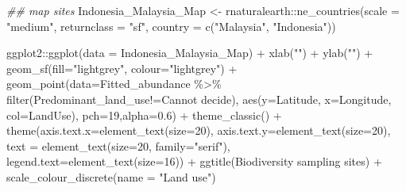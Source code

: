 \documentclass[
  letterpaper,
  DIV=11,
  numbers=noendperiod]{scrartcl}
\newenvironment{Shaded}{\begin{snugshade}}{\end{snugshade}}
\newcommand{\AttributeTok}[1]{\textcolor[rgb]{0.40,0.45,0.13}{#1}}
\newcommand{\DecValTok}[1]{\textcolor[rgb]{0.68,0.00,0.00}{#1}}
\newcommand{\DocumentationTok}[1]{\textcolor[rgb]{0.37,0.37,0.37}{\textit{#1}}}
\newcommand{\FloatTok}[1]{\textcolor[rgb]{0.68,0.00,0.00}{#1}}
\newcommand{\FunctionTok}[1]{\textcolor[rgb]{0.28,0.35,0.67}{#1}}
\newcommand{\NormalTok}[1]{\textcolor[rgb]{0.00,0.23,0.31}{#1}}
\newcommand{\OtherTok}[1]{\textcolor[rgb]{0.00,0.23,0.31}{#1}}
\newcommand{\SpecialCharTok}[1]{\textcolor[rgb]{0.37,0.37,0.37}{#1}}
\newcommand{\StringTok}[1]{\textcolor[rgb]{0.13,0.47,0.30}{#1}}
\begin{document}
\begin{Shaded}
\begin{Highlighting}[]
\DocumentationTok{\#\# map sites}
\NormalTok{Indonesia\_Malaysia\_Map }\OtherTok{\textless{}{-}}\NormalTok{ rnaturalearth}\SpecialCharTok{::}\FunctionTok{ne\_countries}\NormalTok{(}\AttributeTok{scale =} \StringTok{"medium"}\NormalTok{, }\AttributeTok{returnclass =} \StringTok{"sf"}\NormalTok{, }\AttributeTok{country =} \FunctionTok{c}\NormalTok{(}\StringTok{"Malaysia"}\NormalTok{, }\StringTok{"Indonesia"}\NormalTok{))}

\NormalTok{ggplot2}\SpecialCharTok{::}\FunctionTok{ggplot}\NormalTok{(}\AttributeTok{data =}\NormalTok{ Indonesia\_Malaysia\_Map) }\SpecialCharTok{+} \FunctionTok{xlab}\NormalTok{(}\StringTok{""}\NormalTok{) }\SpecialCharTok{+} \FunctionTok{ylab}\NormalTok{(}\StringTok{""}\NormalTok{) }\SpecialCharTok{+}
  \FunctionTok{geom\_sf}\NormalTok{(}\AttributeTok{fill=}\StringTok{"lightgrey"}\NormalTok{, }\AttributeTok{colour=}\StringTok{"lightgrey"}\NormalTok{) }\SpecialCharTok{+}
  \FunctionTok{geom\_point}\NormalTok{(}\AttributeTok{data=}\NormalTok{Fitted\_abundance }\SpecialCharTok{\%\textgreater{}\%} 
               \FunctionTok{filter}\NormalTok{(Predominant\_land\_use}\SpecialCharTok{!=}\StringTok{\textquotesingle{}Cannot decide\textquotesingle{}}\NormalTok{),}
             \FunctionTok{aes}\NormalTok{(}\AttributeTok{y=}\NormalTok{Latitude, }\AttributeTok{x=}\NormalTok{Longitude, }\AttributeTok{col=}\NormalTok{LandUse),}
             \AttributeTok{pch=}\DecValTok{19}\NormalTok{,}\AttributeTok{alpha=}\FloatTok{0.6}\NormalTok{) }\SpecialCharTok{+}
  \FunctionTok{theme\_classic}\NormalTok{() }\SpecialCharTok{+}
  \FunctionTok{theme}\NormalTok{(}\AttributeTok{axis.text.x=}\FunctionTok{element\_text}\NormalTok{(}\AttributeTok{size=}\DecValTok{20}\NormalTok{), }
        \AttributeTok{axis.text.y=}\FunctionTok{element\_text}\NormalTok{(}\AttributeTok{size=}\DecValTok{20}\NormalTok{),}
        \AttributeTok{text =} \FunctionTok{element\_text}\NormalTok{(}\AttributeTok{size=}\DecValTok{20}\NormalTok{, }\AttributeTok{family=}\StringTok{"serif"}\NormalTok{), }
        \AttributeTok{legend.text=}\FunctionTok{element\_text}\NormalTok{(}\AttributeTok{size=}\DecValTok{16}\NormalTok{)) }\SpecialCharTok{+}
  \FunctionTok{ggtitle}\NormalTok{(}\StringTok{\textquotesingle{}Biodiversity sampling sites\textquotesingle{}}\NormalTok{) }\SpecialCharTok{+} 
  \FunctionTok{scale\_colour\_discrete}\NormalTok{(}\AttributeTok{name =} \StringTok{"Land use"}\NormalTok{)}
\end{Highlighting}
\end{Shaded}
\end{document}

